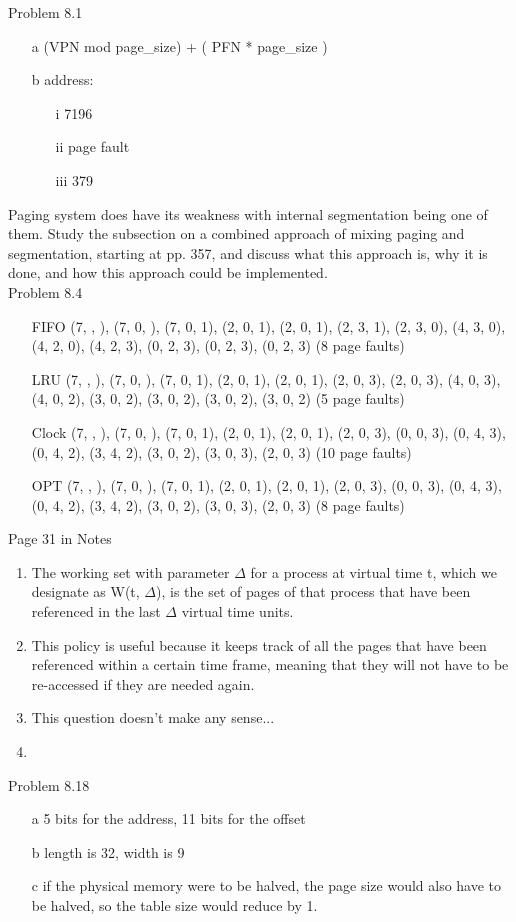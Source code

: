 \documentclass[12pt]{amsart}
\begin{document}
Problem 8.1
\begin{enumerate}
\item[a] (VPN mod page\_size) + ( PFN * page\_size )
\item[b] address:
\begin{enumerate}
\item[i] 7196 
\item[ii] page fault
\item[iii] 379
\end{enumerate}
\end{enumerate}

Paging system does have its weakness with internal segmentation being one of them. Study the subsection on a combined approach of mixing paging and segmentation, starting at pp. 357, and discuss what this approach is, why it is done, and how this approach could be implemented.\\

Problem 8.4
\begin{enumerate}
\item[FIFO] (7, , ), (7, 0, ), (7, 0, 1), (2, 0, 1), (2, 0, 1), (2, 3, 1), (2, 3, 0), (4, 3, 0), (4, 2, 0), (4, 2, 3), (0, 2, 3),  (0, 2, 3), (0, 2, 3) (8 page faults)
\item[LRU] (7, , ), (7, 0, ), (7, 0, 1), (2, 0, 1), (2, 0, 1), (2, 0, 3), (2, 0, 3), (4, 0, 3), (4, 0, 2), (3, 0, 2), (3, 0, 2), (3, 0, 2), (3, 0, 2) (5 page faults)
\item[Clock] (7, , ), (7, 0, ), (7, 0, 1), (2, 0, 1), (2, 0, 1), (2, 0, 3), (0, 0, 3), (0, 4, 3), (0, 4, 2), (3, 4, 2), (3, 0, 2),  (3, 0, 3), (2, 0, 3) (10 page faults)
\item[OPT]  (7, , ), (7, 0, ), (7, 0, 1), (2, 0, 1), (2, 0, 1), (2, 0, 3), (0, 0, 3), (0, 4, 3), (0, 4, 2), (3, 4, 2), (3, 0, 2),  (3, 0, 3), (2, 0, 3) (8 page faults)
\end{enumerate}

Page 31 in Notes 
\begin{enumerate}
\item The working set with parameter $\Delta$ for a process at virtual time t, which we designate as W(t, $\Delta$), is the set of pages of that process that have been referenced in the last $\Delta$ virtual time units.
\item This policy is useful because it keeps track of all the pages that have been referenced within a certain time frame, meaning that they will not have to be re-accessed if they are needed again.
\item This question doesn't make any sense...
\item 
\end{enumerate}

Problem 8.18
\begin{enumerate}
\item[a] 5 bits for the address, 11 bits for the offset
\item[b] length is 32, width is 9
\item[c] if the physical memory were to be halved, the page size would also have to be halved, so the table size would reduce by 1.
\end{enumerate}
\end{document}
